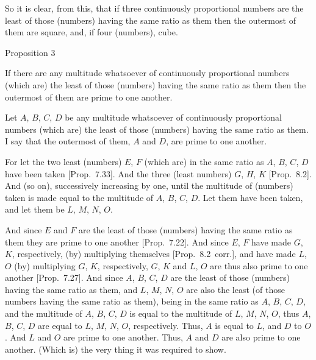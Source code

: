 So  it is clear, from this,  that if three continuously proportional numbers are the
least of those (numbers) having the same ratio as them then the outermost
of them are square, and, if four (numbers), cube.


\begin{center}
{\large Proposition 3}
\end{center}

If there are any multitude whatsoever of continuously proportional
numbers (which are)  the least of those (numbers) having the same ratio as them then the outermost of them are prime to one another.

\epsfysize=2in
\centerline{}

 Let $A$, $B$, $C$, $D$ be  any multitude whatsoever of continuously proportional
numbers (which are)  the least of those (numbers) having the same ratio as them. I say that the outermost of them, $A$ and $D$, are prime to
one another.

For let the two 
least (numbers) $E$, $F$ (which are) in the same ratio as $A$, $B$, $C$,
$D$
have been taken [Prop.~7.33]. And the three
(least numbers) $G$, $H$, $K$ [Prop.~8.2].
And (so on), successively increasing by one, until the multitude of
(numbers) taken is made equal to the multitude of $A$, $B$, $C$,  $D$.
Let them have been taken, and let them be $L$, $M$, $N$,  $O$.

And since $E$ and $F$ are the least of those (numbers) having the
same ratio as them they are prime to one another [Prop.~7.22]. And since  $E$, $F$ have made
 $G$,  $K$, respectively, (by) multiplying themselves [Prop.~8.2~corr.], and  have made $L$,  $O$ 
(by) multiplying  $G$, $K$, respectively,  $G$, $K$ and $L$, $O$ are thus
 also prime to one another [Prop.~7.27]. 
And since $A$, $B$, $C$, $D$ are the least of those (numbers) having
the same ratio as them, and $L$, $M$, $N$,  $O$ are also the
least (of those numbers having the same ratio as them), being in the
same ratio as $A$, $B$, $C$, $D$, and the
multitude of $A$, $B$, $C$,  $D$ is equal to the multitude
of $L$, $M$, $N$,  $O$,  thus $A$, $B$, $C$,  $D$ are
equal to  $L$, $M$, $N$,  $O$, respectively. Thus, $A$ is equal to $L$, and $D$ to $O$. And $L$ and $O$ are prime to one another. Thus,
$A$ and $D$ are also prime to one another. (Which is) the very thing it was required to show.


